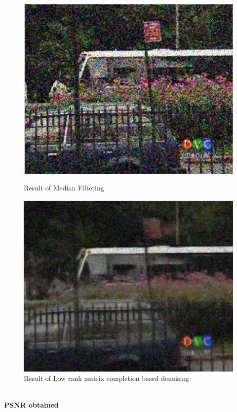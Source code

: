 \documentclass{article}
\begin{document}
\begin{figure}[H]
    \centering
    \begin{minipage}{.45\textwidth}
        \centering
        \includegraphics[width=\linewidth]{Images/Bus_1_median_filter.png}
        \caption{Result of Median Filtering}
    \end{minipage}
    \begin{minipage}{.45\textwidth}
        \centering
        \includegraphics[width=\linewidth]{Images/Bus_1_denoised.png}
        \caption{Result of Low rank matrix completion based denoising}
    \end{minipage}
\end{figure}
\\
\textbf{PSNR obtained}
\end{document}
